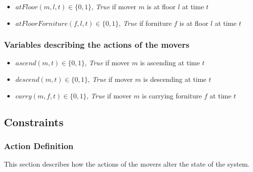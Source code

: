 \documentclass[a4paper, 11pt]{article}
\begin{document}
\begin{itemize}
    \item $atFloor(m, l, t) \in \{0, 1\}$, \textit{True} if mover $m$ is at floor $l$ at time $t$
    \item $atFloorForniture(f, l, t) \in \{0, 1\}$, \textit{True} if forniture $f$ is at floor $l$ at time $t$
\end{itemize}

\subsubsection{Variables describing the actions of the movers}

\begin{itemize}
    \item $ascend(m, t) \in \{0, 1\}$, \textit{True} if mover $m$ is ascending at time $t$
    \item $descend(m, t) \in \{0, 1\}$, \textit{True} if mover $m$ is descending at time $t$
    \item $carry(m, f,  t) \in \{0, 1\}$, \textit{True} if mover $m$ is carrying forniture $f$ at time $t$
\end{itemize}

\subsection{Constraints}

\subsubsection{Action Definition}

This section describes how the actions of the movers alter the state of the system.
\end{document}
